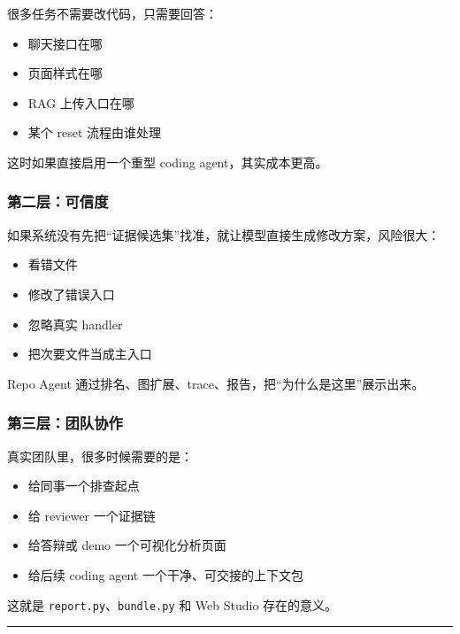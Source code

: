 \documentclass[UTF8,12pt,openany]{ctexbook}
\begin{document}
很多任务不需要改代码，只需要回答：\par

\begin{itemize}
\item 聊天接口在哪
\item 页面样式在哪
\item RAG 上传入口在哪
\item 某个 reset 流程由谁处理
\end{itemize}

这时如果直接启用一个重型 coding agent，其实成本更高。\par

\subsubsection{第二层：可信度}

如果系统没有先把“证据候选集”找准，就让模型直接生成修改方案，风险很大：\par

\begin{itemize}
\item 看错文件
\item 修改了错误入口
\item 忽略真实 handler
\item 把次要文件当成主入口
\end{itemize}

Repo Agent 通过排名、图扩展、trace、报告，把“为什么是这里”展示出来。\par

\subsubsection{第三层：团队协作}

真实团队里，很多时候需要的是：\par

\begin{itemize}
\item 给同事一个排查起点
\item 给 reviewer 一个证据链
\item 给答辩或 demo 一个可视化分析页面
\item 给后续 coding agent 一个干净、可交接的上下文包
\end{itemize}

这就是 \texttt{report.py}、\texttt{bundle.py} 和 Web Studio 存在的意义。\par

\hrule
\end{document}
